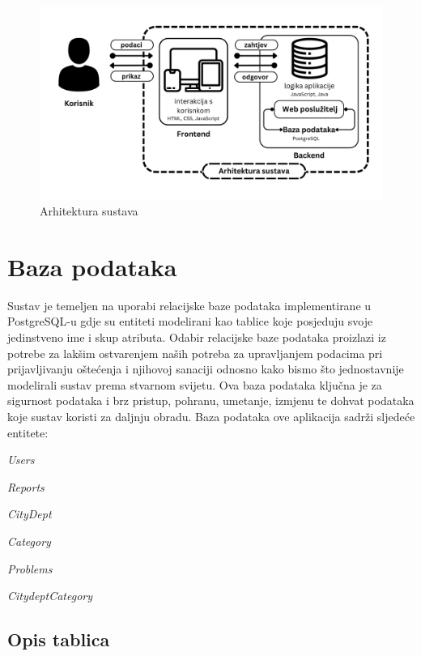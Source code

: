 \begin{figure}[H]
	\includegraphics[scale=0.25]{slike/Arhitektura_sustava.png} %
	\centering
	\caption{Arhitektura sustava}
	\label{fig:Arhitektura}
\end{figure}


\section{Baza podataka}

\noindent Sustav je temeljen na uporabi relacijske baze podataka implementirane u PostgreSQL-u gdje su entiteti modelirani kao tablice koje posjeduju svoje jedinstveno ime i skup atributa.
Odabir relacijske baze podataka proizlazi iz potrebe za lakšim ostvarenjem naših potreba za upravljanjem podacima pri prijavljivanju oštećenja i njihovoj sanaciji
odnosno kako bismo što jednostavnije modelirali sustav prema stvarnom svijetu.
Ova baza podataka ključna je za sigurnost podataka i brz pristup, pohranu, umetanje, izmjenu te dohvat podataka koje sustav koristi za daljnju obradu.
Baza podataka ove aplikacija sadrži sljedeće entitete:
\begin{packed_item}
	\item \textit{Users}
	\item \textit{Reports}
	\item \textit{CityDept}
	\item \textit{Category}
	\item \textit{Problems}
	\item \textit{CitydeptCategory}
\end{packed_item}



\subsection{Opis tablica}

